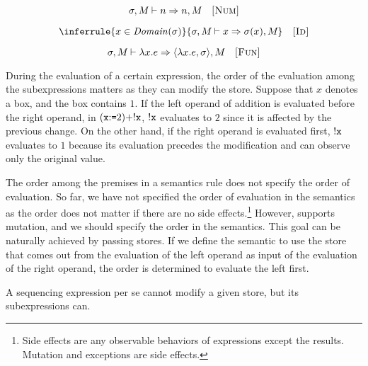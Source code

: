 
\vspace{-1em}

\[
  \sigma,M_{}\vdash n\Rightarrow n,M_{}
  \quad\textsc{[Num]}
\]

\vspace{-1em}


\vspace{-1em}

\[
  \inferrule
  { x\in\dom{\sigma} }
  { \sevald{}{x}{\sigma(x)}{} }
  \quad\textsc{[Id]}
\]

\vspace{-1em}


\vspace{-1em}

\[
  \sigma,M_{}\vdash\lambda x.e\Rightarrow\langle\lambda x.e,\sigma\rangle,M_{}
  \quad\textsc{[Fun]}
\]

During the evaluation of a certain expression,
the order of the evaluation among the subexpressions matters as they can modify the
store. Suppose that $x$ denotes a box, and the box contains $1$.
If the left operand of addition is evaluated before the right operand, in
$(\texttt{x}{:}\texttt{=}2)+!\texttt{x}$, $!\texttt{x}$ evaluates to $2$ since it is
affected by the previous change. On the other hand, if the
right operand is evaluated first, $!\texttt{x}$ evaluates to $1$ because
its evaluation precedes the modification and can observe only the original
value.

The order among the premises in a semantics rule does not specify the order of
evaluation. So far, we have not specified the order of evaluation in the
semantics as the order does not matter if there are no side
effects.\footnote{Side effects are any observable behaviors of expressions except the
results. Mutation and exceptions are side effects.}
 However, \Lang supports mutation, and we should specify
the order in the semantics. This goal can be naturally achieved by passing
stores. If we define the semantic to use the store that comes out from the
evaluation of the left operand as input of the evaluation of the right operand,
the order is determined to evaluate the left first.

A sequencing expression per se cannot modify a given store, but its subexpressions
can.


